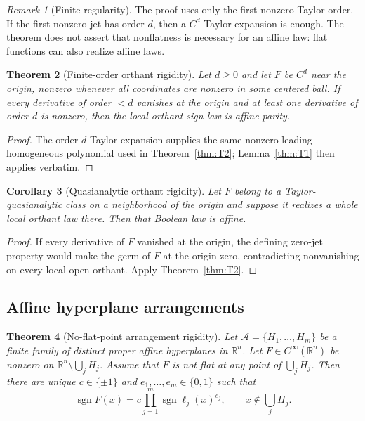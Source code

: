 \documentclass[11pt]{article}
\newtheorem{theorem}{Theorem}[section]
\newtheorem{corollary}[theorem]{Corollary}
\theoremstyle{definition}
\theoremstyle{remark}
\newtheorem{remark}[theorem]{Remark}
\newcommand{\R}{\mathbb{R}}
\newcommand{\bits}{\{0,1\}}
\newcommand{\sign}{\operatorname{sgn}}
\newcommand{\cA}{\mathcal{A}}
\begin{document}
\begin{remark}[Finite regularity]
The proof uses only the first nonzero Taylor order. If the first nonzero jet has order $d$, then a $C^d$ Taylor expansion is enough. The theorem does not assert that nonflatness is necessary for an affine law: flat functions can also realize affine laws.
\end{remark}

\begin{theorem}[Finite-order orthant rigidity]\label{thm:finiteC}
Let $d\ge 0$ and let $F$ be $C^d$ near the origin, nonzero whenever all coordinates are nonzero in some centered ball. If every derivative of order $<d$ vanishes at the origin and at least one derivative of order $d$ is nonzero, then the local orthant sign law is affine parity.
\end{theorem}

\begin{proof}
The order-$d$ Taylor expansion supplies the same nonzero leading homogeneous polynomial used in Theorem~\ref{thm:T2}; Lemma~\ref{thm:T1} then applies verbatim.
\end{proof}

\begin{corollary}[Quasianalytic orthant rigidity]\label{cor:quasiorth}
Let $F$ belong to a Taylor-quasianalytic class on a neighborhood of the origin and suppose it realizes a whole local orthant law there. Then that Boolean law is affine.
\end{corollary}

\begin{proof}
If every derivative of $F$ vanished at the origin, the defining zero-jet property would make the germ of $F$ at the origin zero, contradicting nonvanishing on every local open orthant. Apply Theorem~\ref{thm:T2}.
\end{proof}

\subsection{Affine hyperplane arrangements}

\begin{theorem}[No-flat-point arrangement rigidity]\label{thm:T3}
Let $\cA=\{H_1,\dots,H_m\}$ be a finite family of distinct proper affine hyperplanes in $\R^n$. Let $F\in C^\infty(\R^n)$ be nonzero on $\R^n\setminus\bigcup_jH_j$. Assume that $F$ is not flat at any point of $\bigcup_jH_j$. Then there are unique $c\in\{\pm1\}$ and $e_1,\dots,e_m\in\bits$ such that
\begin{equation}\label{eq:arrparity}
 \sign F(x)
 =c\prod_{j=1}^m\sign\ell_j(x)^{e_j},
 \qquad x\notin\bigcup_jH_j.
\end{equation}
\end{theorem}
\end{document}
